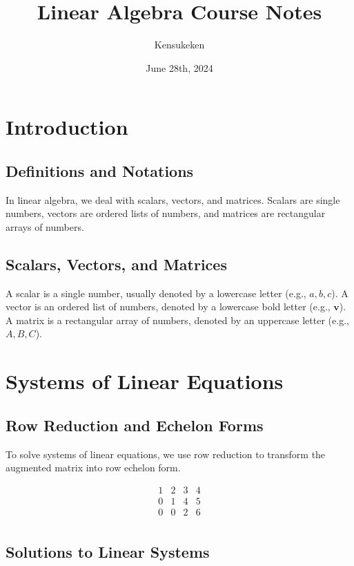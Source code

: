 \documentclass{article}
\title{Linear Algebra Course Notes}
\author{Kensukeken}
\date{June 28th, 2024}
\begin{document}
\maketitle

\section{Introduction}

\subsection{Definitions and Notations}

In linear algebra, we deal with scalars, vectors, and matrices. Scalars are single numbers, vectors are ordered lists of numbers, and matrices are rectangular arrays of numbers.

\subsection{Scalars, Vectors, and Matrices}

A scalar is a single number, usually denoted by a lowercase letter (e.g., \(a, b, c\)). A vector is an ordered list of numbers, denoted by a lowercase bold letter (e.g., \(\mathbf{v}\)). A matrix is a rectangular array of numbers, denoted by an uppercase letter (e.g., \(A, B, C\)).

\section{Systems of Linear Equations}

\subsection{Row Reduction and Echelon Forms}

To solve systems of linear equations, we use row reduction to transform the augmented matrix into row echelon form.

\[
\begin{array}{ccc|c}
1 & 2 & 3 & 4 \\
0 & 1 & 4 & 5 \\
0 & 0 & 2 & 6 \\
\end{array}
\]

\subsection{Solutions to Linear Systems}
\end{document}
